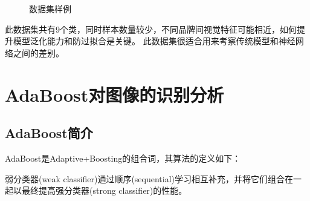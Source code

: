 \documentclass[UTF8]{ctexart}
\begin{document}
\begin{figure}[H]
    \centering
{}\quad
{}\quad
{}\quad
{}\quad
 
\caption{数据集样例}
\label{数据集样例}
\end{figure}

此数据集共有9个类，同时样本数量较少，不同品牌间视觉特征可能相近，如何提升模型泛化能力和防过拟合是关键。
此数据集很适合用来考察传统模型和神经网络之间的差别。

\section{AdaBoost对图像的识别分析}
\subsection{AdaBoost简介}

AdaBoost是Adaptive+Boosting的组合词，其算法的定义如下： \par
弱分类器(weak classifier)通过顺序(sequential)学习相互补充，并将它们组合在一起以最终提高强分类器(strong classifier)的性能。 \par
\end{document}
